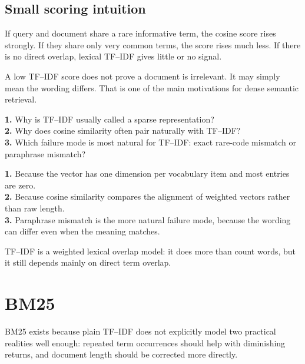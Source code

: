 \documentclass[11pt,oneside]{report}
\begin{document}
\section*{Small scoring intuition}
If query and document share a rare informative term, the cosine score rises strongly. If they share only very common terms, the score rises much less. If there is no direct overlap, lexical TF--IDF gives little or no signal.

\begin{warningbox}
A low TF--IDF score does not prove a document is irrelevant. It may simply mean the wording differs. That is one of the main motivations for dense semantic retrieval.
\end{warningbox}

\begin{selfcheckbox}
\textbf{1.} Why is TF--IDF usually called a sparse representation?\\
\textbf{2.} Why does cosine similarity often pair naturally with TF--IDF?\\
\textbf{3.} Which failure mode is most natural for TF--IDF: exact rare-code mismatch or paraphrase mismatch?
\end{selfcheckbox}

\begin{answerbox}
\textbf{1.} Because the vector has one dimension per vocabulary item and most entries are zero.\\
\textbf{2.} Because cosine similarity compares the alignment of weighted vectors rather than raw length.\\
\textbf{3.} Paraphrase mismatch is the more natural failure mode, because the wording can differ even when the meaning matches.
\end{answerbox}

\begin{rememberbox}
TF--IDF is a weighted lexical overlap model: it does more than count words, but it still depends mainly on direct term overlap.
\end{rememberbox}


\chapter{BM25}

\begin{purposebox}
BM25 exists because plain TF--IDF does not explicitly model two practical realities well enough: repeated term occurrences should help with diminishing returns, and document length should be corrected more directly.
\end{purposebox}
\end{document}
